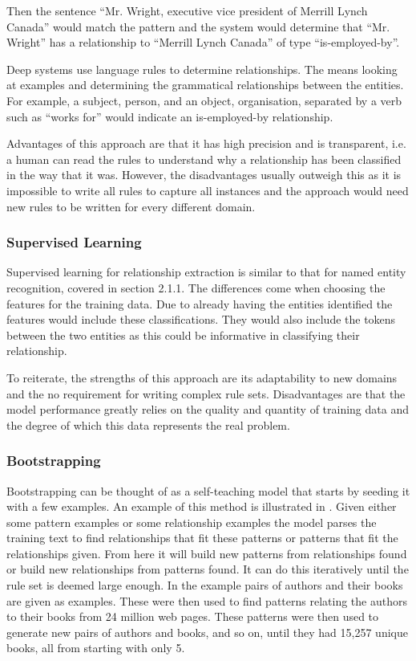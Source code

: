\documentclass[11pt,oneside]{book}
\begin{document}
\noindent Then the sentence “Mr. Wright, executive vice president of Merrill Lynch Canada” would match the pattern and the system would determine that “Mr. Wright” has a relationship to “Merrill Lynch Canada” of type “is-employed-by”.

Deep systems use language rules to determine relationships. The means looking at examples and determining the grammatical relationships between the entities. For example, a subject, person, and an object, organisation, separated by a verb such as “works for” would indicate an is-employed-by relationship.

Advantages of this approach are that it has high precision and is transparent, i.e. a human can read the rules to understand why a relationship has been classified in the way that it was. However, the disadvantages usually outweigh this as it is impossible to write all rules to capture all instances and the approach would need new rules to be written for every different domain.

\subsubsection{Supervised Learning}

Supervised learning for relationship extraction is similar to that for named entity recognition, covered in section 2.1.1. The differences come when choosing the features for the training data. Due to already having the entities identified the features would include these classifications. They would also include the tokens between the two entities as this could be informative in classifying their relationship.

To reiterate, the strengths of this approach are its adaptability to new domains and the no requirement for writing complex rule sets. Disadvantages are that the model performance greatly relies on the quality and quantity of training data and the degree of which this data represents the real problem.

\subsubsection{Bootstrapping}
Bootstrapping can be thought of as a self-teaching model that starts by seeding it with a few examples. An example of this method is illustrated in \citet{dipre_bootstrapping}. Given either some pattern examples or some relationship examples the model parses the training text to find relationships that fit these patterns or patterns that fit the relationships given. From here it will build new patterns from relationships found or build new relationships from patterns found. It can do this iteratively until the rule set is deemed large enough. In the \citet{dipre_bootstrapping} example pairs of authors and their books are given as examples. These were then used to find patterns relating the authors to their books from 24 million web pages. These patterns were then used to generate new pairs of authors and books, and so on, until they had 15,257 unique books, all from starting with only 5.
\end{document}
